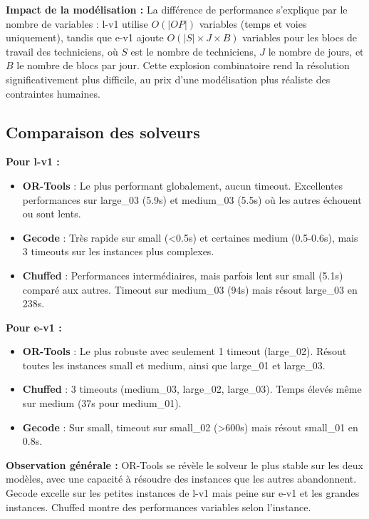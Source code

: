 \textbf{Impact de la modélisation :} La différence de performance s'explique par le nombre de variables : l-v1 utilise $O(|OP|)$ variables (temps et voies uniquement), tandis que e-v1 ajoute $O(|S| \times J \times B)$ variables pour les blocs de travail des techniciens, où $S$ est le nombre de techniciens, $J$ le nombre de jours, et $B$ le nombre de blocs par jour. Cette explosion combinatoire rend la résolution significativement plus difficile, au prix d'une modélisation plus réaliste des contraintes humaines.

\subsection{Comparaison des solveurs}

\textbf{Pour l-v1 :}
\begin{itemize}
	\item \textbf{OR-Tools} : Le plus performant globalement, aucun timeout. Excellentes performances sur large\_03 (5.9s) et medium\_03 (5.5s) où les autres échouent ou sont lents.
	\item \textbf{Gecode} : Très rapide sur small (<0.5s) et certaines medium (0.5-0.6s), mais 3 timeouts sur les instances plus complexes.
	\item \textbf{Chuffed} : Performances intermédiaires, mais parfois lent sur small (5.1s) comparé aux autres. Timeout sur medium\_03 (94s) mais résout large\_03 en 238s.
\end{itemize}

\textbf{Pour e-v1 :}
\begin{itemize}
	\item \textbf{OR-Tools} : Le plus robuste avec seulement 1 timeout (large\_02). Résout toutes les instances small et medium, ainsi que large\_01 et large\_03.
	\item \textbf{Chuffed} : 3 timeouts (medium\_03, large\_02, large\_03). Temps élevés même sur medium (37s pour medium\_01).
	\item \textbf{Gecode} : Sur small, timeout sur small\_02 (>600s) mais résout small\_01 en 0.8s.
\end{itemize}

\textbf{Observation générale :} OR-Tools se révèle le solveur le plus stable sur les deux modèles, avec une capacité à résoudre des instances que les autres abandonnent. Gecode excelle sur les petites instances de l-v1 mais peine sur e-v1 et les grandes instances. Chuffed montre des performances variables selon l'instance.
